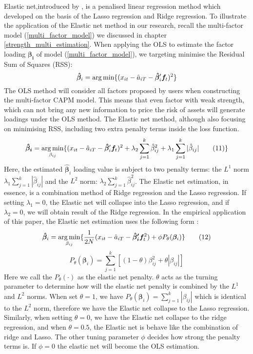 Elastic net,introduced by ,  is a penalised linear regression method which developed on the basis of the Lasso regression \cite{Tibshirani1996} and Ridge regression.
To illustrate the application of the Elastic net method in our research, recall the multi-factor model (\ref{multi_factor_model}) we discussed in chapter \ref{strength_multi_estimation}.
When applying the OLS to estimate the factor loading $\bm{\beta_{i}}$ of model (\ref{multi_factor_model}), we targeting minimise the Residual Sum of Squares (RSS):
\[  \bm{\hat{\beta}}_i =   \operatorname*{arg\,min}\{  (x_{it} - \hat{a}_{iT} - \bm{\hat{\beta}}_i^{\prime}\bm{f}_t )^2 \}    \]
The OLS method will consider all factors proposed by users when constructing the multi-factor CAPM model.
This means that even factor with weak strength, which can not bring any new information to price the risk of assets will generate loadings under the OLS method.
The Elastic net method, although also focusing on minimising RSS, including two extra penalty terms inside the loss function.
\[   \bm{\hat{\beta}_{i}}  = \operatorname*{arg\,min}_{\beta_{ij}}\{ (x_{it} - \hat{a}_{iT} - \bm{\hat{\beta}}_{i} ^{\prime}\bm{f}_{t})^2 + \lambda_2\sum_{j = 1}^k\hat{\beta}_{ij}^2  + \lambda_1\sum_{j=1}^k|\hat{\beta}_{ij}|  \label{ENcriterion} \tag{11}   \}    \]
Here, the estimated $\hat{\bm{\beta}}_i$ loading value is subject to two penalty terms: the $L^1$ norm $\lambda_1\sum_{j=1}^k|\hat{\beta}_{ij}|$ and the $L^2$ norm: $\lambda_2\sum_{j = 1}^k\hat{\beta}_{ij}^2$.
The Elastic net estimation, in essence, is a combination method of Ridge regression and the Lasso regression.
If setting $\lambda_1 = 0$, the Elastic net will collapse into the Lasso regression, and if $\lambda_2 = 0$, we will obtain result of the Ridge regression.
In the empirical application of this paper, the Elastic net estimation uses the following form \cite{Friedman2010}:
\[		\bm{\hat{\beta}}_{i} = \operatorname*{arg\,min}_{\beta_{ij}}\{ \frac{1}{2N} (x_{it}-\hat{a}_{iT} - \bm{\hat{\beta}_{i}^{\prime}}\bm{f}_t ^2 ) +\phi P_{\theta}(\bm{\beta}_i)  \} \label{EN:empirical_formula}\tag{12} \]
\[	P_{\theta}(\bm{\beta}_i) =\sum_{j=1}^k [ (1-\theta)\beta_{ij}^2 + \theta |\beta_{ij}|] \label{EN:elastic_net_penalty} \tag{13}\]
Here we call the $P_{\theta}(\cdot)$ as the elastic net penalty.
$\theta$  acts as the turning parameter to determine how will the elastic net penalty is combined by the $L^1$ and $L^2$ norms.
When set $\theta = 1$, we have $P_{\theta}(\bm{\beta}_i) =\sum_{j=1}^k  |\beta_{ij}|$ which is identical to the $L^2$ norm, therefore we have the Elastic net collapse to the Lasso regression.
Similarly, when setting $\theta = 0$, we have the Elastic net collapse to the ridge regression, and when $\theta = 0.5$, the Elastic net is behave like the combination of ridge and Lasso.
The other tuning parameter $\phi$ decides how strong the penalty terms is.
If $\phi = 0$ the elastic net will become the OLS estimation.

